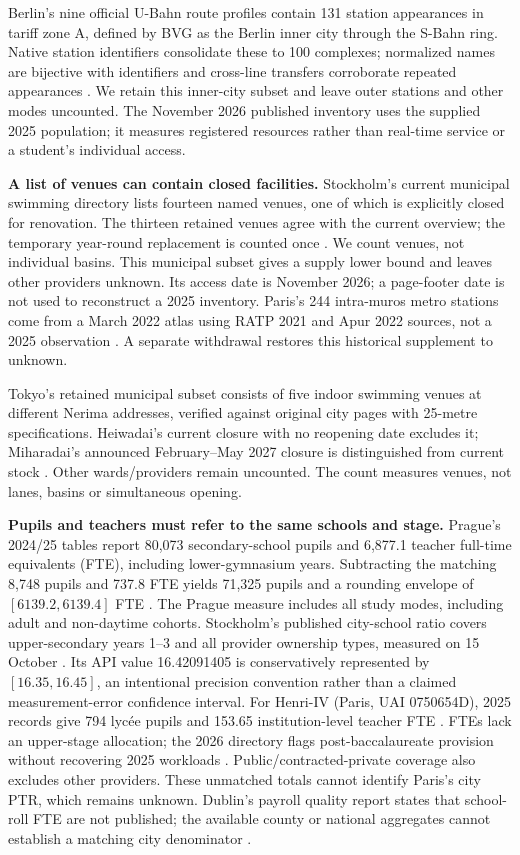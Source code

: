Berlin's nine official U-Bahn route profiles contain 131 station appearances
in tariff zone A, defined by BVG as the Berlin inner city through the S-Bahn
ring. Native station identifiers consolidate these to 100 complexes; normalized
names are bijective with identifiers and cross-line transfers corroborate
repeated appearances \cite{bvg}. We retain this inner-city subset and leave
outer stations and other modes uncounted. The November 2026 published inventory
uses the supplied 2025 population; it measures registered resources rather
than real-time service or a student's individual access.

\textbf{A list of venues can contain closed facilities.}
Stockholm's current municipal swimming directory lists fourteen named venues,
one of which is explicitly closed for renovation. The thirteen retained venues
agree with the current overview; the temporary year-round replacement is
counted once \cite{stockpool}. We count venues, not individual basins. This
municipal subset gives a supply lower bound and leaves other providers unknown.
Its access date is November 2026; a page-footer date is not used to reconstruct
a 2025 inventory. Paris's 244 intra-muros metro stations come from a March 2022
atlas using RATP 2021 and Apur 2022 sources, not a 2025 observation
\cite{apur}. A separate withdrawal restores this historical supplement to unknown.

Tokyo's retained municipal subset consists of five indoor swimming venues at different Nerima addresses, verified against original city pages with 25-metre specifications. Heiwadai's current closure with no reopening date excludes it; Miharadai's announced February--May 2027 closure is distinguished from current stock \cite{nerimapool,nerimaclose}. Other wards/providers remain uncounted. The count measures venues, not lanes, basins or simultaneous opening.

\textbf{Pupils and teachers must refer to the same schools and stage.}
Prague's 2024/25 tables report 80,073 secondary-school pupils and 6,877.1
teacher full-time equivalents (FTE), including lower-gymnasium years.
Subtracting the matching 8,748 pupils and 737.8 FTE yields 71,325 pupils and
a rounding envelope of $[6139.2,6139.4]$ FTE \cite{prague}. The Prague
measure includes all study modes, including adult and non-daytime cohorts.
Stockholm's
published city-school ratio covers upper-secondary years 1--3 and all provider
ownership types, measured on 15 October \cite{kolada}. Its API value
16.42091405 is conservatively represented by $[16.35,16.45]$, an intentional
precision convention rather than a claimed measurement-error confidence interval.
For Henri-IV (Paris, UAI 0750654D), 2025 records give 794 lyc\'ee pupils
and 153.65 institution-level teacher FTE \cite{deppmatch}. FTEs lack an
upper-stage allocation; the 2026 directory flags post-baccalaureate provision
without recovering 2025 workloads \cite{deppdirectory}. Public/contracted-private
coverage also excludes other providers. These unmatched totals cannot identify
Paris's city PTR, which remains unknown. Dublin's payroll quality report states that school-roll FTE are not published; the available county or national aggregates cannot establish a matching city denominator \cite{irelandfte}.

